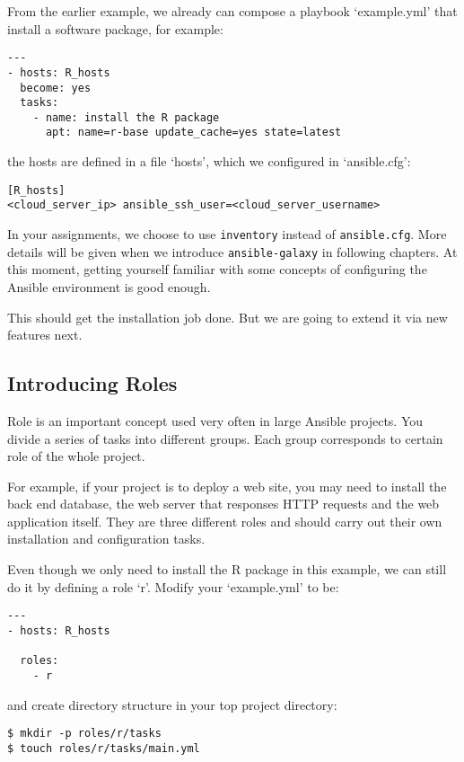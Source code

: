 From the earlier example, we already can compose a playbook
`example.yml' that install a software package, for example:

\begin{verbatim}
---
- hosts: R_hosts
  become: yes
  tasks:
    - name: install the R package
      apt: name=r-base update_cache=yes state=latest
\end{verbatim}

the hosts are defined in a file `hosts', which we configured in
`ansible.cfg':

\begin{verbatim}
[R_hosts]
<cloud_server_ip> ansible_ssh_user=<cloud_server_username>
\end{verbatim}

In your assignments, we choose to use \texttt{inventory} instead of
\texttt{ansible.cfg}. More details will be given when we introduce
\texttt{ansible-galaxy} in following chapters. At this moment, getting
yourself familiar with some concepts of configuring the Ansible
environment is good enough.

This should get the installation job done. But we are going to extend it
via new features next.

\subsection{Introducing Roles}\label{introducing-roles}

Role is an important concept used very often in large Ansible projects.
You divide a series of tasks into different groups. Each group
corresponds to certain role of the whole project.

For example, if your project is to deploy a web site, you may need to
install the back end database, the web server that responses HTTP
requests and the web application itself. They are three different roles
and should carry out their own installation and configuration tasks.

Even though we only need to install the R package in this example, we
can still do it by defining a role `r'. Modify your `example.yml' to be:

\begin{verbatim}
---
- hosts: R_hosts

  roles:
    - r
\end{verbatim}

and create directory structure in your top project directory:

\begin{verbatim}
$ mkdir -p roles/r/tasks
$ touch roles/r/tasks/main.yml
\end{verbatim}

